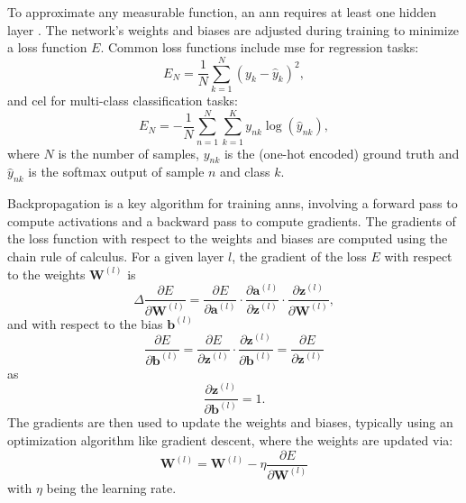 \documentclass[12pt, a4paper, headinclude, twoside, plainheadsepline, open=right, numbers=noenddot, hidelinks, toc=listof, toc=bibliography]{scrreprt}
\begin{document}
To approximate any measurable function, an \ac{ann} requires at least one hidden layer \cite{hornikMultilayerFeedforwardNetworks1989}. 
The network's weights and biases are adjusted during training to minimize a loss function $E$.
Common loss functions include \ac{mse} for regression tasks:
\begin{equation}
E_N = \frac{1}{N} \sum_{k=1}^{N}(y_{k} - \hat{y}_{k})^2,
\end{equation}
and \ac{cel} for multi-class classification tasks:
\begin{equation}
E_N = -\frac{1}{N} \sum_{n=1}^{N} \sum_{k=1}^{K} y_{nk} \log (\hat{y}_{nk}),
\end{equation}
where $N$ is the number of samples, $y_{nk}$ is the (one-hot encoded) ground truth and $\hat{y}_{nk}$ is the softmax output of sample $n$ and class $k$.

Backpropagation \cite{rumelhartLearningRepresentationsBackpropagating1986} is a key algorithm for training \acp{ann}, involving a forward pass to compute activations and a backward pass to compute gradients. 
The gradients of the loss function with respect to the weights and biases are computed using the chain rule of calculus. For a given layer $l$, the gradient of the loss $E$ with respect to the weights $\mathbf{W}^{(l)}$ is
\begin{equation}
\Delta
\frac{\partial E}{\partial \mathbf{W}^{(l)}} = \frac{\partial E}{\partial \mathbf{a}^{(l)}} \cdot \frac{\partial \mathbf{a}^{(l)}}{\partial \mathbf{z}^{(l)}} \cdot \frac{\partial \mathbf{z}^{(l)}}{\partial \mathbf{W}^{(l)}},
\end{equation}
and with respect to the bias $\mathbf{b}^{(l)}$
\begin{equation}
\frac{\partial E}{\partial \mathbf{b}^{(l)}} = \frac{\partial E}{\partial \mathbf{z}^{(l)}} \cdot \frac{\partial \mathbf{z}^{(l)}}{\partial \mathbf{b}^{(l)}} = \frac{\partial E}{\partial \mathbf{z}^{(l)}}
\end{equation}
as 
\begin{equation}
\frac{\partial \mathbf{z}^{(l)}}{\partial \mathbf{b}^{(l)}} = 1.
\end{equation}
The gradients are then used to update the weights and biases, typically using an optimization algorithm like gradient descent, where the weights are updated via:
\begin{equation}
\mathbf{W}^{(l)} = \mathbf{W}^{(l)} - \eta \frac{\partial E}{\partial \mathbf{W}^{(l)}}
\end{equation}
with $\eta$ being the learning rate.
\end{document}
